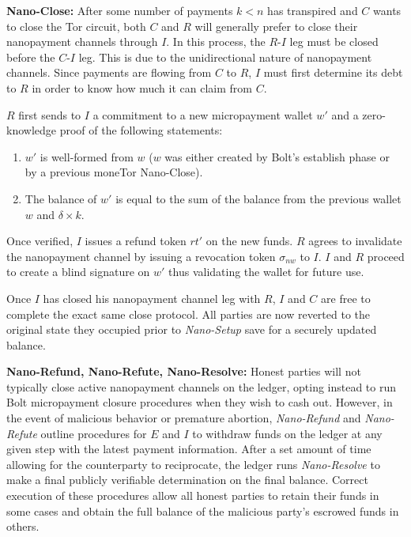 \medskip \noindent\textbf{Nano-Close:} After some number of payments $k < n$ has transpired and $C$ wants to close the Tor circuit, both $C$ and $R$ will generally prefer to close their nanopayment channels through $I$.
In this process, the $R$-$I$ leg must be closed before the $C$-$I$ leg.
This is due to the unidirectional nature of nanopayment channels.
Since payments are flowing from $C$ to $R$, $I$ must first determine its debt to $R$ in order to know how much it can claim from $C$.

$R$ first sends to $I$ a commitment to a new micropayment wallet $w'$ and a zero-knowledge proof of the following statements:

\begin{enumerate}
\item $w'$ is well-formed from $w$ ($w$ was either created by Bolt's establish phase or by a previous moneTor Nano-Close).
\item The balance of $w'$ is equal to the sum of the balance from the previous wallet $w$ and $\delta \times k$.
\end{enumerate}

Once verified, $I$ issues a refund token $rt'$ on the new funds.
$R$ agrees to invalidate the nanopayment channel by issuing a revocation token $\sigma_{nw}$ to $I$.
$I$ and $R$ proceed to create a blind signature on $w'$ thus validating the wallet for future use.

Once $I$ has closed his nanopayment channel leg with $R$, $I$ and $C$ are free to complete the exact same close protocol.
All parties are now reverted to the original state they occupied prior to \emph{Nano-Setup} save for a securely updated balance.

\medskip \noindent\textbf{Nano-Refund, Nano-Refute, Nano-Resolve:} Honest parties will not typically close active nanopayment channels on the ledger, opting instead to run Bolt micropayment closure procedures when they wish to cash out.
However, in the event of malicious behavior or premature abortion, \emph{Nano-Refund} and \emph{Nano-Refute} outline procedures for $E$ and $I$ to withdraw funds on the ledger at any given step with the latest payment information.
After a set amount of time allowing for the counterparty to reciprocate, the ledger runs \emph{Nano-Resolve} to make a final publicly verifiable determination on the final balance.
Correct execution of these procedures allow all honest parties to retain their funds in some cases and obtain the full balance of the malicious party's escrowed funds in others.

